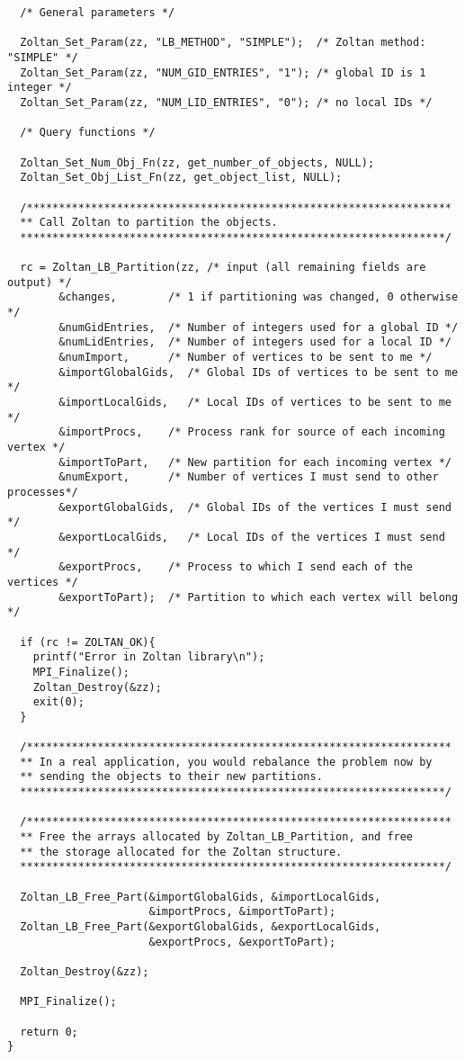 \begin{flushleft}
\begin{verbatim}
  /* General parameters */

  Zoltan_Set_Param(zz, "LB_METHOD", "SIMPLE");  /* Zoltan method: "SIMPLE" */
  Zoltan_Set_Param(zz, "NUM_GID_ENTRIES", "1"); /* global ID is 1 integer */
  Zoltan_Set_Param(zz, "NUM_LID_ENTRIES", "0"); /* no local IDs */

  /* Query functions */

  Zoltan_Set_Num_Obj_Fn(zz, get_number_of_objects, NULL);
  Zoltan_Set_Obj_List_Fn(zz, get_object_list, NULL);

  /******************************************************************
  ** Call Zoltan to partition the objects.
  ******************************************************************/

  rc = Zoltan_LB_Partition(zz, /* input (all remaining fields are output) */
        &changes,        /* 1 if partitioning was changed, 0 otherwise */ 
        &numGidEntries,  /* Number of integers used for a global ID */
        &numLidEntries,  /* Number of integers used for a local ID */
        &numImport,      /* Number of vertices to be sent to me */
        &importGlobalGids,  /* Global IDs of vertices to be sent to me */
        &importLocalGids,   /* Local IDs of vertices to be sent to me */
        &importProcs,    /* Process rank for source of each incoming vertex */
        &importToPart,   /* New partition for each incoming vertex */
        &numExport,      /* Number of vertices I must send to other processes*/
        &exportGlobalGids,  /* Global IDs of the vertices I must send */
        &exportLocalGids,   /* Local IDs of the vertices I must send */
        &exportProcs,    /* Process to which I send each of the vertices */
        &exportToPart);  /* Partition to which each vertex will belong */

  if (rc != ZOLTAN_OK){
    printf("Error in Zoltan library\n");
    MPI_Finalize();
    Zoltan_Destroy(&zz);
    exit(0);
  }

  /******************************************************************
  ** In a real application, you would rebalance the problem now by
  ** sending the objects to their new partitions.
  ******************************************************************/

  /******************************************************************
  ** Free the arrays allocated by Zoltan_LB_Partition, and free
  ** the storage allocated for the Zoltan structure.
  ******************************************************************/

  Zoltan_LB_Free_Part(&importGlobalGids, &importLocalGids, 
                      &importProcs, &importToPart);
  Zoltan_LB_Free_Part(&exportGlobalGids, &exportLocalGids, 
                      &exportProcs, &exportToPart);

  Zoltan_Destroy(&zz);

  MPI_Finalize();

  return 0;
}
\end{verbatim}
\end{flushleft}

